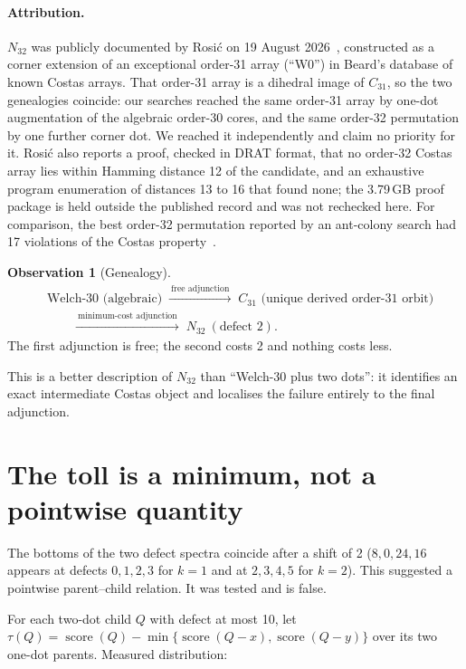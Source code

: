 \documentclass[11pt,a4paper,oneside]{report}
\theoremstyle{definition}
\newtheorem{observation}[theorem]{Observation}
\newcommand{\score}{\operatorname{score}}
\begin{document}
\paragraph{Attribution.} $N_{32}$ was publicly documented by Rosi\'c on 19 August
2026~\cite{p2-rosic2026gist}, constructed as a corner extension of an exceptional order-31 array (``W0'') in
Beard's database of known Costas arrays. That order-31 array is a dihedral image of $C_{31}$, so the two
genealogies coincide: our searches reached the same order-31 array by one-dot augmentation of the
algebraic order-30 cores, and the same order-32 permutation by one further corner dot. We reached it
independently and claim no priority for it. Rosi\'c also reports a proof, checked in DRAT format, that
no order-32 Costas array lies within Hamming distance 12 of the candidate, and an exhaustive program
enumeration of distances 13 to 16 that found none; the 3.79\,GB proof package is held outside the
published record and was not rechecked here. For comparison, the best order-32 permutation reported by an
ant-colony search had 17 violations of the Costas property~\cite{p2-vulakh2022mdraco}.

\begin{observation}[Genealogy]
\label{p2-obs:genealogy}
\[
\begin{aligned}
&\text{Welch-30 (algebraic)}\;\xrightarrow{\ \text{free adjunction}\ }\;C_{31}\text{ (unique derived order-31 orbit)}\\
&\qquad\xrightarrow{\ \text{minimum-cost adjunction}\ }\;N_{32}\ (\text{defect }2).
\end{aligned}
\]
The first adjunction is free; the second costs 2 and nothing costs less.
\end{observation}

This is a better description of $N_{32}$ than ``Welch-30 plus two dots'': it
identifies an exact intermediate Costas object and localises the failure
entirely to the final adjunction.

\section{The toll is a minimum, not a pointwise quantity}
\label{p2-sec:toll}

The bottoms of the two defect spectra coincide after a shift of 2
($8,0,24,16$ appears at defects $0,1,2,3$ for $k=1$ and at $2,3,4,5$ for
$k=2$). This suggested a pointwise parent--child relation. It was tested and is
false.

For each two-dot child $Q$ with defect at most 10, let
$\tau(Q)=\score(Q)-\min\{\score(Q-x),\score(Q-y)\}$ over its two one-dot
parents. Measured distribution:
\end{document}
